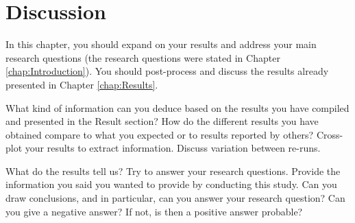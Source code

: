 \chapter{Discussion}

In this chapter, you should expand on your results and address your main research questions (the research
questions were stated in Chapter \ref{chap:Introduction}). You should post-process and discuss the results already presented in Chapter \ref{chap:Results}.

What kind of information can you deduce based on the results you have compiled and presented in the Result section? How do the different results you have obtained compare to what you expected or to results reported by others? Cross-plot your results to extract information. Discuss variation between re-runs.

What do the results tell us? Try to answer your research questions. Provide the information you said you wanted to provide by conducting this study. Can you draw conclusions, and in particular, can you answer your research question? Can you give a negative answer? If not, is then a positive answer probable?